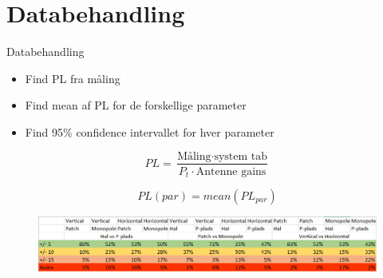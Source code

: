 %	
%	
%	
%

\section{Databehandling}
\begin{frame}{Databehandling}

\begin{itemize}
\item Find PL fra måling
\item Find mean af PL for de forskellige parameter
\item Find 95\% confidence intervallet for hver parameter
\end{itemize}
\begin{minipage}{0.54\textwidth}
\begin{equation*}
PL = \frac{\text{Måling}\cdot\text{system tab}}{P_t \cdot\text{Antenne gains}}
\end{equation*}
\end{minipage}%
\begin{minipage}{0.45\textwidth}
\begin{equation*}
PL(par) = mean\left(PL_{par}\right)
\end{equation*}
\end{minipage}
\begin{figure}
\centering
\includegraphics[width=\columnwidth]{figures/Data.png}
\end{figure}
\end{frame}


